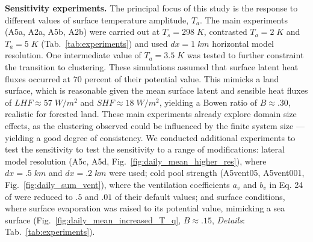 \documentclass{article}
\begin{document}
\begin{methods}
\noindent
{\bf Sensitivity experiments.} 
The principal focus of this study is the response to different values of surface temperature amplitude, $T_a$. 
The main experiments (A5a, A2a, A5b, A2b) were carried out at $T_s=298\;K$, contrasted $T_a=2\;K$ and $T_a=5\;K$ (Tab.~\ref{tab:experiments}) and used $dx=1\;km$ horizontal model resolution.
One intermediate value of $T_a=3.5\;K$ was tested to further constraint the transition to clustering.
These simulations assumed that surface latent heat fluxes occurred at $70$ percent of their potential value. 
This mimicks a land surface, which is reasonable given the mean surface latent and sensible heat fluxes of $LHF\approx 57\;W/m^2$ and $SHF\approx 18\;W/m^2$, yielding a Bowen ratio of $B\approx .30$, realistic for forested land. 
These main experiments already explore domain size effects, as the clustering observed could be influenced by the finite system size --- yielding a good degree of consistency.
We conducted additional experiments to test the sensitivity to test the sensitivity to a range of modifications: lateral model resolution (A5c, A5d, Fig.~\ref{fig:daily_mean_higher_res}), where $dx=.5\;km$ and $dx=.2\;km$ were used; 
cold pool strength (A5vent05, A5vent001, Fig.~\ref{fig:daily_sum_vent}), where the ventilation coefficients $a_v$ and $b_v$ in Eq. 24 of \citeauthor{seifert2006two} \citeyear{seifert2006two} were reduced to $.5$ and $.01$ of their default values; 
and surface conditions, where surface evaporation was raised to its potential value, mimicking a sea surface (Fig.~\ref{fig:daily_mean_increased_T_q}, $B\approx .15$, {\it Details}: Tab.~\ref{tab:experiments}).


\end{methods}
\end{document}
